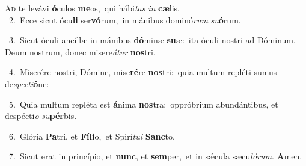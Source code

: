 \lettrine{\initial\textcolor{\initialcolor}{A}}{d} te levávi \textbf{ó}\-culos \textbf{me}\-os,~\star qui hábi\textit{tas} \textit{in} \textbf{cæ}\-lis.\\
{\numbfont\textcolor{\numbcolor}{~2.}}~Ecce sicut ócu\textbf{li} ser\-\textbf{vó}\-rum,~\star in mánibus dominó\textit{rum} \textit{su}\-\textbf{ó}rum.\par
{\numbfont\textcolor{\numbcolor}{~3.}}~Sicut óculi ancíllæ in mánibus \textbf{dó}\-minæ \textbf{su}\-æ:~\star ita óculi nostri ad Dóminum, Deum nostrum, donec misere\-\textit{á}\-\textit{tur} \textbf{nos}\-tri.\par
{\numbfont\textcolor{\numbcolor}{~4.}}~Miserére nostri, Dómine, mise\-\textbf{ré}\-re \textbf{nos}\-tri:~\star quia multum repléti sumus de\-\textit{spec}\-\textit{ti}\textbf{ó}ne:\par
{\numbfont\textcolor{\numbcolor}{~5.}}~Quia multum repléta est \textbf{á}\-nima \textbf{nos}\-tra:~\star oppróbrium abundántibus, et despécti\textit{o} \textit{su}\-\textbf{pér}bis.\par
{\numbfont\textcolor{\numbcolor}{~6.}}~Glória \textbf{Pa}\-tri, et \textbf{Fí}\-\textbf{li}o,~\star et Spirí\-\textit{tu}\-\textit{i} \textbf{Sanc}\-to.\par
{\numbfont\textcolor{\numbcolor}{~7.}}~Sicut erat in princípio, et \textbf{nunc}\-, et \textbf{sem}\-per,~\star et in sǽcula sæcu\-\textit{ló}\-\textit{rum}. \textbf{A}\-men.\par

